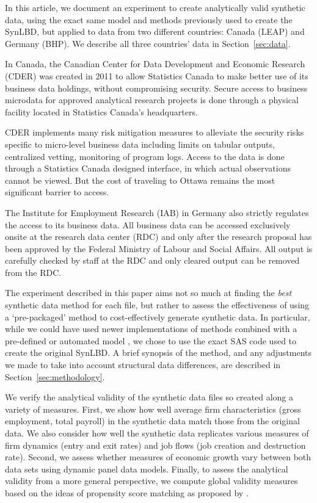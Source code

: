 \documentclass[10pt]{article}
\begin{document}
In this article, we document an experiment to create analytically valid synthetic data, using the exact same model and methods previously used to create the \ac{SynLBD}, but applied to data from two different countries: Canada (\ac{LEAP}) and Germany (\ac{BHP}). We describe all three countries' data in Section~\ref{sec:data}. 


In Canada, the Canadian Center for Data Development and Economic Research (CDER) was created in 2011 to allow Statistics Canada to make better use of its business data holdings, without compromising security. Secure access  to business microdata for approved analytical research projects is done through a physical facility located in Statistics Canada’s headquarters. 

CDER implements many risk mitigation measures to alleviate the security risks specific to micro-level business data including limits on tabular outputs, centralized vetting, monitoring of program logs. Access to the data is done through a Statistics Canada designed interface, in which actual observations cannot be viewed. But the cost of traveling to Ottawa remains the most significant barrier to access.

The Institute for Employment Research (IAB) in Germany also strictly regulates the access to its business data. All business data can  be accessed exclusively onsite at the research data center (RDC) and only after the research proposal has been approved by the Federal Ministry of Labour and Social Affairs. All output is carefully checked by staff at the RDC and only cleared output can be removed  from the RDC. 

The experiment described in this paper aims not so much at finding the \textit{best} synthetic data method for each file, but rather to assess the effectiveness of using a `pre-packaged' method to cost-effectively generate synthetic data. In particular, while we could have used newer implementations of methods combined with a pre-defined or automated model \citep{JSSv074i11,Raab_Nowok_Dibben_2018}, we chose to use the exact SAS code used to create the original \ac{SynLBD}. A brief synopsis of the  method, and any adjustments we made to take into account structural data differences, are described in Section~\ref{sec:methodology}.

We verify the analytical validity of the synthetic data files so created along a variety of measures. First, we show how well average firm characteristics (gross employment, total payroll) in the synthetic data  match those from the original data. We also consider how well the synthetic data  replicates various measures of firm dynamics (entry and exit rates) and job flows (job creation and destruction rate). Second, we assess whether measures of economic growth vary between both data sets using dynamic panel data models. Finally, to assess the analytical validity from a more general perspective, we  compute global validity measures based on the ideas of propensity score matching as proposed by \citet{Woo_Reiter_Oganian_Karr_2009,Snoke_RSSA2018}.
\end{document}
